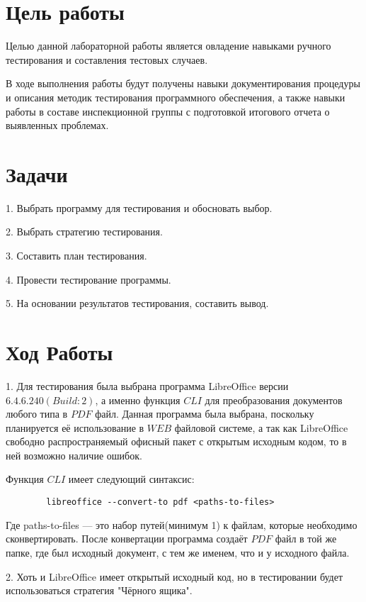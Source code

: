 \documentclass[12pt]{article}
\begin{document}
    \section*{Цель работы}

    Целью данной лабораторной работы является овладение навыками ручного тестирования и составления тестовых случаев.

    В ходе выполнения работы будут получены навыки документирования процедуры и описания методик тестирования программного обеспечения, а также навыки работы в составе инспекционной группы с подготовкой итогового отчета о выявленных проблемах.

    \section*{Задачи}

    1. Выбрать программу для тестирования и обосновать выбор.

    2. Выбрать стратегию тестирования.

    3. Составить план тестирования.

    4. Провести тестирование программы.

    5. На основании результатов тестирования, составить вывод.

    \section*{Ход Работы}
    1. Для тестирования была выбрана программа LibreOffice версии $6.4.6.2 40(Build:2)$, а именно функция $CLI$ для преобразования документов любого типа в $PDF$ файл. Данная программа была выбрана, поскольку планируется её использование в $WEB$ файловой системе, а так как LibreOffice свободно распространяемый офисный пакет с открытым исходным кодом, то в ней возможно наличие ошибок.

    Функция $CLI$ имеет следующий синтаксис:
    \begin{lstlisting}
        libreoffice --convert-to pdf <paths-to-files>
    \end{lstlisting}
    Где paths-to-files --- это набор путей(минимум 1) к файлам, которые необходимо сконвертировать. После конвертации программа создаёт $PDF$ файл в той же папке, где был исходный документ, с тем же именем, что и у исходного файла.

    2. Хоть и LibreOffice имеет открытый исходный код, но в тестировании будет использоваться стратегия "Чёрного ящика".
\end{document}

